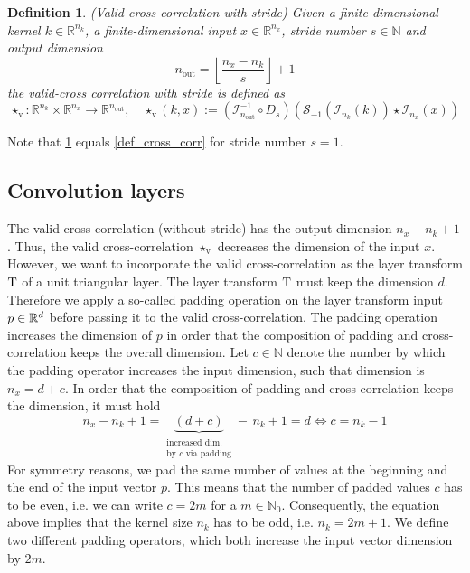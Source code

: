 \documentclass[twoside,a4paper]{article}
\newtheorem{definition}{Definition}
\begin{document}
\begin{definition}\label{def_cross_corr_stride}
	(Valid cross-correlation with stride)
	Given a finite-dimensional kernel $k \in \mathbb{R}^{n_k}$, a finite-dimensional
	input $x \in \mathbb{R}^{n_x}$, stride number $s \in \mathbb{N}$ and output dimension
	\begin{equation*}
		n_{\text{out}} = \left\lfloor \frac{n_x - n_k}{s} \right\rfloor + 1
	\end{equation*}
	the valid-cross correlation with stride is defined as
	\begin{equation*}
		\star_{\text{v}} : \mathbb{R}^{n_k} \times \mathbb{R}^{n_x} \to \mathbb{R}^{n_{\text{out}}},
		\quad \star_{\text{v}}(k,x) := 
		(\mathcal{I}_{n_{\text{out}}}^{-1} \circ D_s)
		(
			\mathcal{S}_{-1}( \mathcal{I}_{n_k}(k)) \star \mathcal{I}_{n_x}(x)
		)
	\end{equation*}
\end{definition}

Note that \cref{def_cross_corr_stride} equals \cref{def_cross_corr} for stride number $s=1$.

\subsection{Convolution layers}

The valid cross correlation (without stride) has the output dimension $n_x - n_k + 1$.
Thus, the valid cross-correlation $\star_{\text{v}}$ decreases the dimension of the input $x$.
However, we want to incorporate the valid cross-correlation as the layer transform $\mathrm{T}$ of a
unit triangular layer. The layer transform $\mathrm{T}$ must keep the dimension $d$.
Therefore we apply a so-called padding operation on the layer transform input $p \in \mathbb{R}^d$ 
before passing it to the valid
cross-correlation. The padding operation increases the dimension of $p$ in order
that the composition of padding and cross-correlation keeps the overall dimension.
Let $c \in \mathbb{N}$ denote the number by which the padding operator increases 
the input dimension, such that dimension is $n_x = d+c$. 
In order that the composition of padding and cross-correlation keeps the dimension, it must hold
\begin{equation*}
	n_x - n_k + 1 = \underbrace{(d+c)}_{\substack{
		\text{increased dim.} \\
		\text{by } c \text{ via padding}
	}} - \, n_k + 1 = d \iff c = n_k-1
\end{equation*}
For symmetry reasons, we pad the same number of values at the beginning and 
the end of the input vector $p$. This means that the number of padded values $c$ has to be even,
i.e. we can write $c=2m$ for a $m \in \mathbb{N}_0$.
Consequently, the equation above implies that the kernel size $n_k$ has to be odd, i.e. 
$n_k = 2m+1$. We define two different padding operators,
which both increase the input vector dimension by $2m$.
\end{document}
